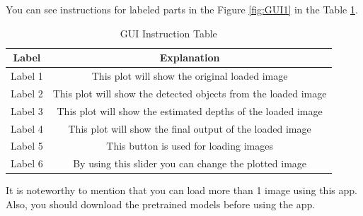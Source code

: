 \documentclass[a4paper, openany]{book}
\begin{document}
You can see instructions for labeled parts in the Figure \ref{fig:GUI1} in the Table \ref{table:GUI1}.

\newpage

\begin{table}[htp]
\caption{GUI Instruction Table}
\begin{center}
\begin{tabular}{c | c }
Label &Explanation \\
\hline
Label 1 & This plot will show the original loaded image \\
Label 2 & This plot will show the detected objects from the loaded image \\
Label 3 & This plot will show the estimated depths of the loaded image \\
Label 4 & This plot will show the final output of the loaded image \\
Label 5 & This button is used for loading images\\
Label 6 & By using this slider you can change the plotted image \\
\end{tabular}
\end{center}
\label{table:GUI1}
\end{table}%

It is noteworthy to mention that you can load more than 1 image using this app. Also, you should download the pretrained models before using the app. 
 
\end{document}

